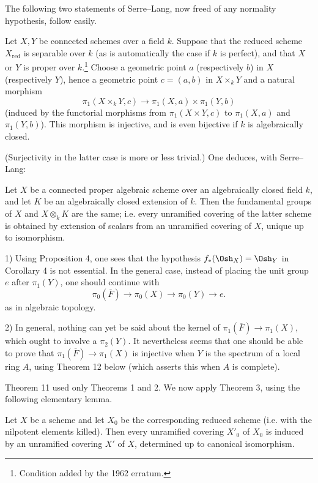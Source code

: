 The following two statements of Serre--Lang, now freed of any normality
hypothesis, follow easily.

 Let $X,Y$ be connected schemes over a field $k$. Suppose
that the reduced scheme $X_{\mathrm{red}}$ is separable over $k$ (as is
automatically the case if $k$ is perfect), and that $X$ or $Y$ is proper over
$k$.\footnote{Condition added by the 1962 erratum.} Choose a geometric
point $a$ (respectively $b$) in $X$ (respectively $Y$), hence a geometric point
$c=(a,b)$ in $X\times_kY$ and a natural morphism
\[
  \pi_1(X\times_kY,c)\longrightarrow
  \pi_1(X,a)\times\pi_1(Y,b)
\]
(induced by the functorial morphisms from $\pi_1(X\times Y,c)$ to
$\pi_1(X,a)$ and $\pi_1(Y,b)$). This morphism is injective, and is even
bijective if $k$ is algebraically closed.

(Surjectivity in the latter case is more or less trivial.) One deduces, with
Serre--Lang:

 Let $X$ be a connected proper algebraic scheme over an algebraically closed field $k$, and let $K$ be an algebraically closed
extension of $k$. Then the fundamental groups of $X$ and $X\otimes_kK$ are
the same; i.e. every unramified covering of the latter scheme is obtained by
extension of scalars from an unramified covering of $X$, unique up to
isomorphism.


1) Using Proposition 4, one sees that the hypothesis
$f_*(\Osh_X)=\Osh_Y$ in Corollary 4 is not essential. In the general case,
instead of placing the unit group $e$ after $\pi_1(Y)$, one should continue
with
\[
  \pi_0(\overline F)\longrightarrow\pi_0(X)
  \longrightarrow\pi_0(Y)\longrightarrow e.
\]
as in algebraic topology.

2) In general, nothing can yet be said about the kernel of
$\pi_1(\overline F)\longrightarrow\pi_1(X)$, which ought to involve a
$\pi_2(Y)$. It nevertheless seems that one should be able to prove that
$\pi_1(\overline F)\longrightarrow\pi_1(X)$ is injective when $Y$ is the
spectrum of a local ring $A$, using Theorem 12 below (which asserts this when
$A$ is complete).

Theorem 11 used only Theorems 1 and 2. We now apply Theorem 3, using the
following elementary lemma.

 Let $X$ be a scheme and let $X_0$ be the corresponding
reduced scheme (i.e. with the nilpotent elements killed). Then every
unramified covering $X'_0$ of $X_0$ is induced by an unramified covering $X'$
of $X$, determined up to canonical isomorphism.

